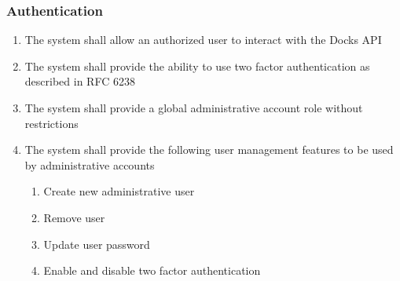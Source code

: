 \documentclass[]{article}
\begin{document}
\subsubsection{Authentication}
\begin{enumerate}[label*=R2.\arabic*.]
	\item The system shall allow an authorized user to interact with the Docks API
	\item The system shall provide the ability to use two factor authentication as described in RFC 6238
	\item The system shall provide a global administrative account role without restrictions
	\item The system shall provide the following user management features to be used by administrative accounts
	\begin{enumerate}[label*=\arabic*.]
		\item Create new administrative user
		\item Remove user
		\item Update user password
		\item Enable and disable two factor authentication
	\end{enumerate}
\end{enumerate}
\end{document}
